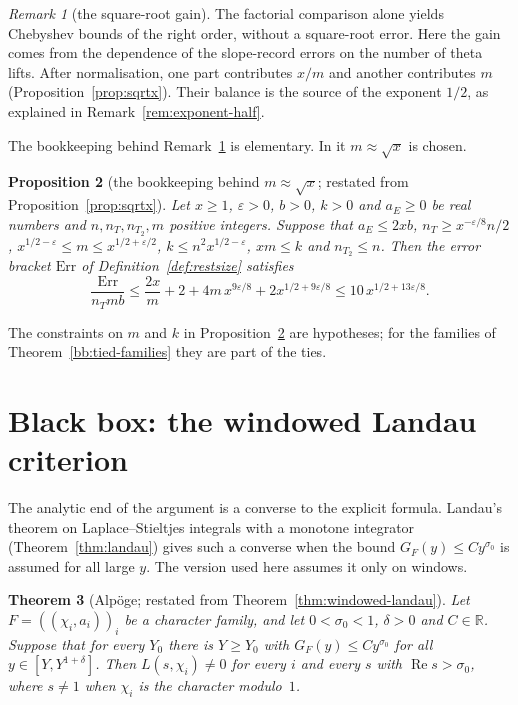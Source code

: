 \documentclass[11pt]{amsbook}
\theoremstyle{plain}
\newtheorem{theorem}{Theorem}[section]
\newtheorem{proposition}[theorem]{Proposition}
\theoremstyle{definition}
\theoremstyle{remark}
\newtheorem{remark}[theorem]{Remark}
\numberwithin{equation}{section}
\numberwithin{figure}{chapter}
\numberwithin{table}{chapter}
\newcommand{\R}{\mathbb{R}}
\newcommand{\eps}{\varepsilon}
\newcommand{\Err}{\mathrm{Err}}
\begin{document}
\begin{remark}[the square-root gain]\label{rem:shape}
The factorial comparison alone yields Chebyshev bounds of the
right order, without a square-root error. Here the gain comes
from the dependence of the slope-record errors on the number
of theta lifts. After normalisation, one part contributes
$x/m$ and another contributes $m$
(Proposition~\ref{prop:sqrtx}). Their balance is the source of
the exponent $1/2$, as explained in
Remark~\ref{rem:exponent-half}.
\end{remark}

\noindent The bookkeeping behind Remark~\ref{rem:shape} is
elementary. In it $m\approx\sqrt x$ is chosen.

\begin{proposition}[the bookkeeping behind $m\approx\sqrt x$;
restated from Proposition~\ref{prop:sqrtx}]
\label{bb:sqrtx}
Let $x\ge1$, $\eps>0$, $b>0$, $k>0$ and $a_E\ge0$ be real numbers and
$n,n_T,n_{T_2},m$ positive integers. Suppose that $a_E\le2xb$,
$n_T\ge x^{-\eps/8}n/2$, $x^{1/2-\eps}\le m\le x^{1/2+\eps/2}$,
$k\le n^2x^{1/2-\eps}$, $xm\le k$ and $n_{T_2}\le n$. Then the error
bracket $\Err$ of Definition~\ref{def:restsize} satisfies
\[
\frac{\Err}{n_Tmb}\le\frac{2x}m+2+4m\,x^{9\eps/8}+2x^{1/2+9\eps/8}
\le10\,x^{1/2+13\eps/8}.
\]
\end{proposition}

\noindent The constraints on $m$ and $k$ in
Proposition~\ref{bb:sqrtx} are hypotheses; for the families of
Theorem~\ref{bb:tied-families} they are part of the ties.

\section{Black box: the windowed Landau criterion}
\label{sec:bb-landau}

The analytic end of the argument is a converse to the explicit
formula. Landau's theorem on Laplace--Stieltjes integrals with a
monotone integrator (Theorem~\ref{thm:landau}) gives such a converse
when the bound $G_F(y)\le Cy^{\sigma_0}$ is assumed for all large
$y$. The version used here assumes it only on windows.

\begin{theorem}[Alp\"oge; restated from
Theorem~\ref{thm:windowed-landau}]
\label{bb:windowed-landau}
Let $F=((\chi_i,a_i))_i$ be a character family, and let
$0<\sigma_0<1$, $\delta>0$ and $C\in\R$. Suppose that for every $Y_0$
there is $Y\ge Y_0$ with $G_F(y)\le Cy^{\sigma_0}$ for all
$y\in[Y,Y^{1+\delta}]$. Then $L(s,\chi_i)\ne0$ for every $i$ and every
$s$ with $\operatorname{Re}s>\sigma_0$, where $s\ne1$ when $\chi_i$ is
the character modulo~$1$.
\end{theorem}
\end{document}
